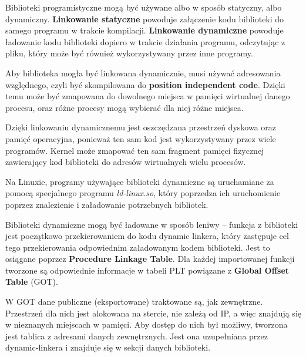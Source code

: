 Biblioteki programistyczne mogą być używane albo w sposób statyczny, albo dynamiczny. \textbf{Linkowanie statyczne} powoduje załączenie kodu biblioteki do samego programu w trakcie kompilacji. \textbf{Linkowanie dynamiczne} powoduje ładowanie kodu biblioteki dopiero w trakcie działania programu, odczytując z pliku, który może być również wykorzystywany przez inne programy.

Aby biblioteka mogła być linkowana dynamicznie, musi używać adresowania względnego, czyli być skompilowana do \textbf{position independent code}. Dzięki temu może być zmapowana do dowolnego miejsca w pamięci wirtualnej danego procesu, oraz różne procesy mogą wybierać dla niej różne miejsca.

Dzięki linkowaniu dynamicznemu jest oszczędzana przestrzeń dyskowa oraz pamięć operacyjna, ponieważ ten sam kod jest wykorzystywany przez wiele programów. Kernel może zmapować ten sam fragment pamięci fizycznej zawierający kod biblioteki do adresów wirtualnych wielu procesów.

Na Linuxie, programy używające biblioteki dynamiczne są uruchamiane za pomocą specjalnego programu \textit{ld-linux.so}, który poprzedza ich uruchomienie poprzez znalezienie i załadowanie potrzebnych bibliotek.

Biblioteki dynamiczne mogą być ładowane w sposób leniwy -- funkcja z biblioteki jest początkowo przekierowaniem do kodu dynamic linkera, który zastępuje cel tego przekierowania odpowiednim załadowanym kodem biblioteki. Jest to osiągane poprzez \textbf{Procedure Linkage Table}. Dla każdej importowanej funkcji tworzone są odpowiednie informacje w tabeli PLT powiązane z \textbf{Global Offset Table} (GOT).

W GOT dane publiczne (eksportowane) traktowane są, jak zewnętrzne. Przestrzeń dla nich jest alokowana na stercie, nie zależą od IP, a więc znajdują się w nieznanych miejscach w pamięci. Aby dostęp do nich był możliwy, tworzona jest tablica z adresami danych zewnętrznych. Jest ona uzupełniana przez dynamic-linkera i znajduje się w sekcji danych biblioteki.